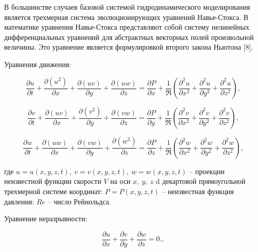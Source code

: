 \begin{multicols}{2}
В большинстве случаев базовой системой гидродинамического моделирования
является трехмерная система эволюционирующих уравнений Навье-Стокса. В
математике уравнения Навье-Стокса представляют собой систему нелинейных
дифференциальных уравнений для абстрактных векторных полей произвольной
величины. Это уравнение является формулировкой второго закона Ньютона
{[}8{]}.

Уравнения движения:
\end{multicols}

\begin{equation}
\frac{\partial u}{\partial t} + \frac{\partial(u^{2})}{\partial x} + \frac{\partial(uv)}{\partial y} + \frac{\partial(uw)}{\partial z} = \frac{\partial P}{\partial x} + \frac{1}{\Re}\left( \frac{\partial^{2}u}{\partial x^{2}} + \frac{\partial^{2}u}{\partial y^{2}} + \frac{\partial^{2}u}{\partial z^{2}} \right),
\end{equation}

\begin{equation}
\frac{\partial v}{\partial t} + \frac{\partial(uv)}{\partial x} + \frac{\partial(v^{2})}{\partial y} + \frac{\partial(vw)}{\partial z} = \frac{\partial P}{\partial y} + \frac{1}{\Re}\left( \frac{\partial^{2}v}{\partial x^{2}} + \frac{\partial^{2}v}{\partial y^{2}} + \frac{\partial^{2}v}{\partial z^{2}} \right),
\end{equation}

\begin{equation}
\frac{\partial w}{\partial t} + \frac{\partial(uw)}{\partial x} + \frac{\partial(vw)}{\partial y} + \frac{\partial(w^{2})}{\partial z} = \frac{\partial P}{\partial z} + \frac{1}{\Re}\left( \frac{\partial^{2}w}{\partial x^{2}} + \frac{\partial^{2}w}{\partial y^{2}} + \frac{\partial^{2}w}{\partial z^{2}} \right),
\end{equation}

где \(u = u(x,y,z,t),\ v = v(x,y,z,t),\ w = w(x,y,z,t)\) -- проекции
неизвестной функции скорости \(V\) на оси \(x,\ y,\ z\) d декартовой
прямоугольной трехмерной системе координат: \(P = P(x,y,z,t)\) --
неизвестная функция давления: \(Re\) -- число Рейнольдса.

Уравнение неразрывности:

\begin{equation}
\frac{\partial u}{\partial x} + \frac{\partial v}{\partial y} + \frac{\partial w}{\partial z} = 0.,
\end{equation}


